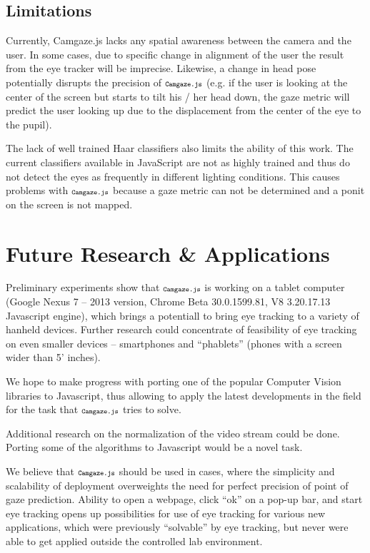 \documentclass[annual]{acmsiggraph}
\newcommand{\Acronym}[1]{\ensuremath{{\small{\texttt{#1}}}}}
\newcommand{\Name}{\Acronym{Camgaze.js}} \newcommand{\False}{\Constant{false}}
\newcommand{\Constant}[1]{\ensuremath{\small{\texttt{#1}}}}
\begin{document}
\subsection{Limitations}

Currently, Camgaze.js lacks any spatial awareness between the camera and the
user. In some cases, due to specific change in alignment of the user the result
from the eye tracker will be imprecise. Likewise, a change in head pose
potentially disrupts the precision of $\Name$ (e.g. if the user is looking at
the center of the screen but starts to tilt his / her head down, the gaze
metric will predict the user looking up due to the displacement from the center
of the eye to the pupil).

The lack of well trained Haar classifiers also limits the ability of this work.
The current classifiers available in JavaScript are not as highly trained and
thus do not detect the eyes as frequently in different lighting conditions.
This causes problems with $\Name$ because a gaze metric can not be determined
and a ponit on the screen is not mapped.


\section{Future Research \& Applications}

Preliminary experiments show that $\Name$ is working on a tablet computer
(Google Nexus 7 -- 2013 version, Chrome Beta 30.0.1599.81, V8 3.20.17.13
Javascript engine), which brings a potentiall to bring eye tracking to a
variety of hanheld devices. Further research could concentrate of feasibility
of eye tracking on even smaller devices -- smartphones and “phablets” (phones
with a screen wider than 5’ inches).

We hope to make progress with porting one of the popular Computer Vision
libraries to Javascript, thus allowing to apply the latest developments in the
field for the task that $\Name$ tries to solve.

Additional research on the normalization of the video stream could be done.
Porting some of the algorithms to Javascript would be a novel task.

We believe that $\Name$ should be used in cases, where the simplicity and
scalability of deployment overweights the need for perfect precision of point
of gaze prediction. Ability to open a webpage, click “ok” on a pop-up bar, and
start eye tracking opens up possibilities for use of eye tracking for various
new applications, which were previously “solvable” by eye tracking, but never
were able to get applied outside the controlled lab environment.
\end{document}

